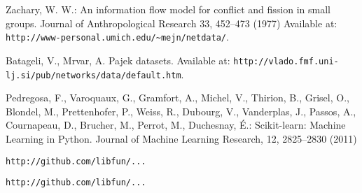 \documentclass{llncs}
\begin{document}
\begin{thebibliography}{28}
Zachary, W. W.:
An information flow model for conflict and fission in small groups.
Journal of Anthropological Research 33, 452--473 (1977)
Available at: \texttt{http://www-personal.umich.edu/\~{}mejn/netdata/}.

Batageli, V., Mrvar, A.
Pajek datasets. 
Available at: \texttt{http://vlado.fmf.uni-lj.si/pub/networks/data/default.htm}.

Pedregosa, F., Varoquaux, G., Gramfort, A., Michel, V., Thirion, B., Grisel, O., Blondel, M., Prettenhofer, P., Weiss, R., Dubourg, V., Vanderplas, J., Passos, A., Cournapeau, D., Brucher, M., Perrot, M., Duchesnay, {\'E}.:
Scikit-learn: Machine Learning in Python.
Journal of Machine Learning Research, 12, 2825--2830 (2011) 

\texttt{http://github.com/libfun/...}

\texttt{http://github.com/libfun/...}

\end{thebibliography}
\end{document}
